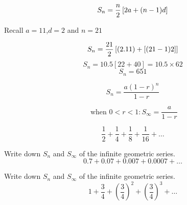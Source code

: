 


\[ S_n  = {n \over 2} \left[ 2a+(n-1)d \right] \]

Recall $a=11$,$d=2$ and $n=21$


\[ S_n  = {21 \over 2} \left[ (2.11) +[(21-1)2] \right] \]
\[ S_n  = 10.5 \left[ 22 + 40 \right]  = 10.5 \times 62\]
\[ S_n  = 651 \] 

\newpage








{

\[ S_n = \frac{a(1-r)^n}{1-r} \]
}
{

\[ \mbox{ when } 0 < r < 1 : S_{\infty} = \frac{a}{1-r} \]
}



\[ \frac{1}{2} + \frac{1}{4} + \frac{1}{8} +  \frac{1}{16} +\ldots  \]






Write down $S_n$ and $S_{\infty}$ of the infinite geometric series.
\[ 0.7 + 0.07 + 0.007 + 0.0007 + \ldots  \]






Write down $S_n$ and $S_{\infty}$ of the infinite geometric series.
\[ 1 + \frac{3}{4} + \left( \frac{3}{4} \right)^2 + \left( \frac{3}{4} \right)^3 + \ldots  \]




